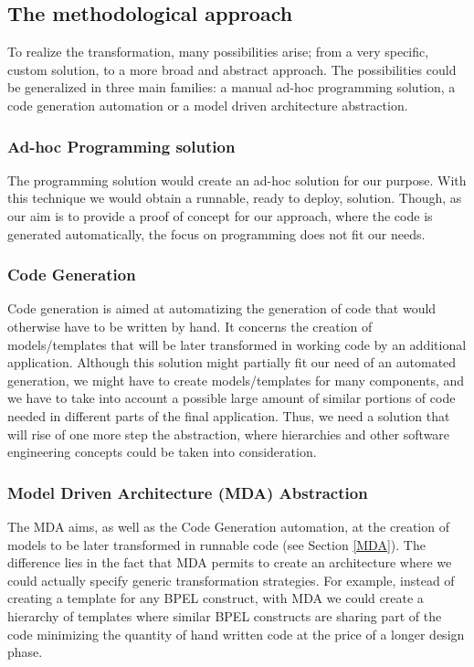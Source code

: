 \subsection{The methodological approach}
\label{sec:ProgrammingVsMDE}
To realize the transformation, many possibilities arise; from a very specific, custom solution, to a more broad and abstract approach. The possibilities could be generalized in three main families: a manual ad-hoc programming solution, a code generation automation or a model driven architecture abstraction.
  \subsubsection{Ad-hoc Programming solution}
The programming solution would create an ad-hoc solution for our purpose. With this technique we would obtain a runnable, ready to deploy, solution. Though, as our aim is to provide a proof of concept for our approach, where the code is generated automatically, the focus on programming does not fit our needs.
  \subsubsection{Code Generation}
Code generation is aimed at automatizing the generation of code that would otherwise have to be written by hand. It concerns the creation of models/templates that will be later transformed in working code by an additional application. Although this solution might partially fit our need of an automated generation, we might have to create models/templates for many components, and we have to take into account a possible large amount of similar portions of code needed in different parts of the final application.  Thus, we need a solution that will rise of one more step the abstraction, where hierarchies and other software engineering concepts could be taken into consideration.
  
 \subsubsection{Model Driven Architecture (MDA) Abstraction}
The MDA aims, as well as the Code Generation automation, at the creation of models to be later transformed in runnable code (see Section \ref{MDA}). The difference lies in the fact that MDA permits to create an architecture where we could actually specify generic transformation strategies. For example, instead of creating a template for any BPEL construct, with MDA we could create a hierarchy of templates where similar BPEL constructs are sharing part of the code minimizing the quantity of hand written code at the price of a longer design phase.
